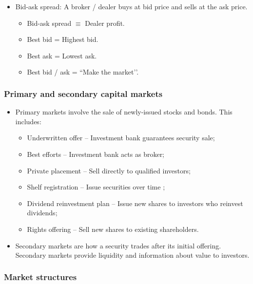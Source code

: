 \documentclass[../notes_compiled.tex]{subfiles}
\begin{document}
\begin{itemize}
\begin{itemize}
\item Bid-ask spread: A broker / dealer buys at bid price and sells at the ask price.
\begin{itemize}
\item Bid-ask spread $\equiv$ Dealer profit.
\item Best bid = Highest bid.
\item Best ask = Lowest ask.
\item Best bid / ask = ``Make the market’’.
\end{itemize}

\end{itemize}


\end{itemize}


\subsubsection{Primary and secondary capital markets}

\begin{itemize}
\item Primary markets involve the sale of newly-issued stocks and bonds. This includes:
\begin{itemize}
\item Underwritten offer -- Investment bank guarantees security sale;
\item Best efforts -- Investment bank acts as broker;
\item Private placement -- Sell directly to qualified investors;
\item Shelf registration -- Issue securities over time ;
\item Dividend reinvestment plan -- Issue new shares to investors who reinvest dividends;
\item Rights offering -- Sell new shares to existing shareholders.
\end{itemize}

\item Secondary markets are how a security trades after its initial offering. Secondary markets provide liquidity and information about value to investors.


\end{itemize}



\subsubsection{Market structures}
\end{document}
